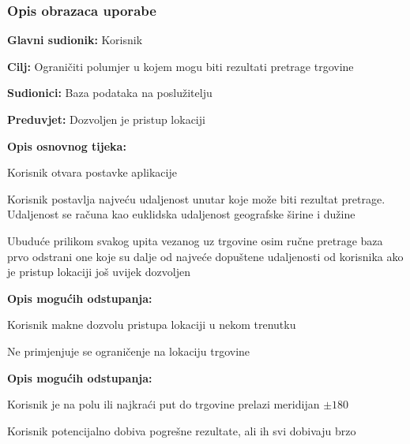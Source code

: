 				\subsubsection{Opis obrazaca uporabe}
			
				
				\noindent {}
				\begin{packed_item}
					\item \textbf{Glavni sudionik:} Korisnik
					\item  \textbf{Cilj:} Ograničiti polumjer u kojem mogu biti rezultati pretrage trgovine
					\item  \textbf{Sudionici:} Baza podataka na poslužitelju
					\item  \textbf{Preduvjet:} Dozvoljen je pristup lokaciji
					\item  \textbf{Opis osnovnog tijeka:}
					\item[] \begin{packed_enum}
						\item Korisnik otvara postavke aplikacije
						\item Korisnik postavlja najveću udaljenost unutar koje može biti rezultat pretrage. Udaljenost se računa kao euklidska udaljenost geografske širine i dužine
						\item Ubuduće prilikom svakog upita vezanog uz trgovine osim ručne pretrage baza prvo odstrani one koje su dalje od najveće dopuštene udaljenosti od korisnika ako je pristup lokaciji još uvijek dozvoljen
					\end{packed_enum}
					\item  \textbf{Opis mogućih odstupanja:}
					\item[] \begin{packed_item}
						\item[3.a] Korisnik makne dozvolu pristupa lokaciji u nekom trenutku
						\item[] \begin{packed_enum}
							\item Ne primjenjuje se ograničenje na lokaciju trgovine 
						\end{packed_enum}
					\end{packed_item}
					\item  \textbf{Opis mogućih odstupanja:}
					\item[] \begin{packed_item}
						\item[3.b] Korisnik je na polu ili najkraći put do trgovine prelazi meridijan $\pm{180}$
						\item[] \begin{packed_enum}
							\item Korisnik potencijalno dobiva pogrešne rezultate, ali ih svi dobivaju brzo
						\end{packed_enum}
					\end{packed_item}
				\end{packed_item}
					

